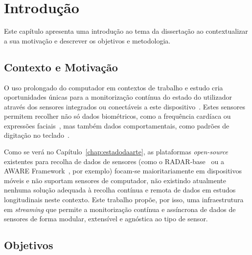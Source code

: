     \chapter{Introdução}
    \label{chap:introduction}

    \begin{introduction}
    Este capítulo apresenta uma introdução ao tema da dissertação ao contextualizar a sua motivação e descrever os objetivos e metodologia.
    \end{introduction}

    \section{Contexto e Motivação}

    O uso prolongado do computador em contextos de trabalho e estudo cria oportunidades únicas para a monitorização contínua do estado do utilizador através dos sensores integrados ou conectáveis a este dispositivo~\cite{keyboard_correction_study,keyboard_speed_study,facial_hrv_study}. Estes sensores permitem recolher não só dados biométricos, como a frequência cardíaca ou expressões faciais~\cite{facial_hrv_study}, mas também dados comportamentais, como padrões de digitação no teclado~\cite{keyboard_speed_study,keyboard_correction_study}.

    Como se verá no Capítulo~\ref{chap:estadodaarte}, as plataformas \textit{open-source} existentes para recolha de dados de sensores (como o RADAR-base~\cite{radarbase} ou a AWARE Framework~\cite{aware}, por exemplo) focam-se maioritariamente em dispositivos móveis e não suportam sensores de computador, não existindo atualmente nenhuma solução adequada à recolha contínua e remota de dados em estudos longitudinais neste contexto. 
    Este trabalho propõe, por isso, uma infraestrutura em \textit{streaming} que permite a monitorização contínua e assíncrona de dados de sensores de forma modular, extensível e agnóstica ao tipo de sensor.

    \section{Objetivos}\label{sec:objectives}

